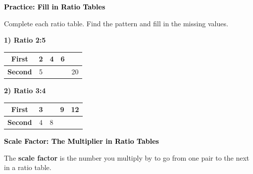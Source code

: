 \documentclass[12pt, letterpaper, fleqn]{article}
\begin{document}
\vspace{4mm}

\begin{tcolorbox}[colback=customteal!20]
\large\textcolor{black}{\textbf{Practice: Fill in Ratio Tables}}
\end{tcolorbox}

\noindent
Complete each ratio table. Find the pattern and fill in the missing values.

\vspace{3mm}

\noindent
\textbf{1) Ratio 2:5}

\begin{center}
\begin{tabular}{|c|c|c|c|c|}
\hline
\textbf{First} & 2 & 4 & 6 & \phantom{0} \\
\hline
\textbf{Second} & 5 & \phantom{0} & \phantom{0} & 20 \\
\hline
\end{tabular}
\end{center}

\vspace{2mm}

\noindent
\textbf{2) Ratio 3:4}

\begin{center}
\begin{tabular}{|c|c|c|c|c|}
\hline
\textbf{First} & 3 & \phantom{0} & 9 & 12 \\
\hline
\textbf{Second} & 4 & 8 & \phantom{0} & \phantom{0} \\
\hline
\end{tabular}
\end{center}

\newpage

\begin{tcolorbox}[colback=customteal!20]
\large\textcolor{black}{\textbf{Scale Factor: The Multiplier in Ratio Tables}}
\end{tcolorbox}

\noindent
The \textbf{scale factor} is the number you multiply by to go from one pair to the next in a ratio table.

\vspace{3mm}
\end{document}
